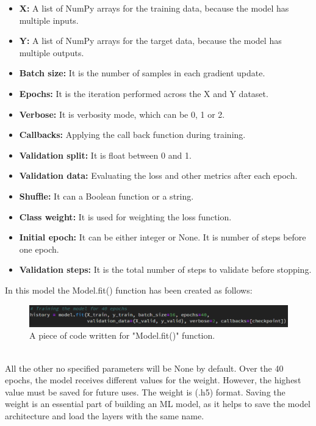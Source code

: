 \begin{itemize}
    \item \textbf{X:} A list of NumPy arrays for the training data, because the model has multiple inputs.
    \item \textbf{Y:} A list of NumPy arrays for the target data, because the model has multiple outputs.
    \item \textbf{Batch size:} It is the number of samples in each gradient update.
    \item \textbf{Epochs:} It is the iteration performed across the X and Y dataset.
    \item \textbf{Verbose:} It is verbosity mode, which can be 0, 1 or 2.
    \item \textbf{Callbacks:} Applying the call back function during training.
    \item \textbf{Validation split:} It is float between 0 and 1.
    \item \textbf{Validation data:} Evaluating the loss and other metrics after each epoch.
    \item \textbf{Shuffle:} It can a Boolean function or a string.
    \item \textbf{Class weight:} It is used for weighting the loss function.
    \item \textbf{Initial epoch:} It can be either integer or None. It is number of steps before one epoch.
    \item \textbf{Validation steps:} It is the total number of steps to validate before stopping.
\end{itemize}
 In this model the Model.fit() function has been created as follows:
 \begin{figure}[ht]
    \centering
    \includegraphics{Figures/fit1}
    \decoRule
    \caption [A piece of code written for "Model.fit()" function.]{A piece of code written for "Model.fit()" function.}
    \label{fig:la}
    \end{figure}\hfill \\
 All the other no specified parameters will be None by default.
 Over the 40 epochs, the model receives different values for the weight. However, the highest value must be saved for future uses. The weight is (.h5) format. Saving the weight is an essential part of building an ML model, as it helps to save the model architecture and load the layers with the same name.
